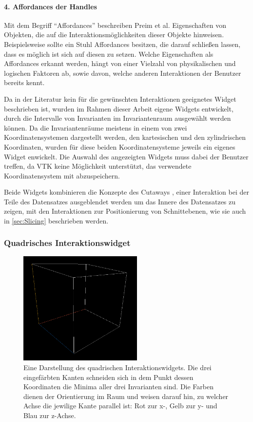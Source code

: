 \documentclass[a4paper,fontsize=12pt,toc=bib,halfparskip,ngerman]{scrartcl}
\begin{document}
\paragraph{4. Affordances der Handles}
Mit dem Begriff ``Affordances'' beschreiben Preim et al. \cite[S.~137]{preim2010interaktive} Eigenschaften von Objekten, die auf die Interaktionsm\"oglichkeiten dieser Objekte hinweisen. Beispielsweise sollte ein Stuhl Affordances besitzen, die darauf schlie{\ss}en lassen, dass es m\"oglich ist sich auf diesen zu setzen. Welche Eigenschaften als Affordances erkannt werden, h\"angt von einer Vielzahl von physikalischen und logischen Faktoren ab, sowie davon, welche anderen Interaktionen der Benutzer bereits kennt.

Da in der Literatur kein f\"ur die gew\"unschten Interaktionen geeignetes Widget beschrieben ist, wurden im Rahmen dieser Arbeit eigene Widgets entwickelt, durch die Intervalle von Invarianten im Invariantenraum ausgew\"ahlt werden k\"onnen. Da die Invariantenr\"aume meistens in einem von zwei Koordinatensystemen dargestellt werden, den kartesischen und den zylindrischen Koordinaten, wurden f\"ur diese beiden Koordinatensysteme jeweils ein eigenes Widget enwickelt. Die Auswahl des angezeigten Widgets muss dabei der Benutzer treffen, da VTK keine M\"oglichkeit unterst\"utzt, das verwendete Koordinatensystem mit abzuspeichern.

Beide Widgets kombinieren die Konzepte des Cutaways \cite[S.~406~f.]{preim2015interaktive}, einer Interaktion bei der Teile des Datensatzes ausgeblendet werden um das Innere des Datensatzes zu zeigen, mit den Interaktionen zur Positionierung von Schnittebenen, wie sie auch in \cref{sec:Slicing} beschrieben werden. 

\subsubsection{Quadrisches Interaktionswidget}

\begin{figure}
	\centering
	\includegraphics[width=0.55\textwidth]{pictures/QuadricInteractions.png}
	\caption{Eine Darstellung des quadrischen Interaktionswidgets. Die drei eingef\"arbten Kanten schneiden sich in dem Punkt dessen Koordinaten die Minima aller drei Invarianten sind. Die Farben dienen der Orientierung im Raum und weisen darauf hin, zu welcher Achse die jewilige Kante parallel ist: Rot zur x-, Gelb zur y- und Blau zur z-Achse.}
	\label{CubicalInteractions}
\end{figure}
\end{document}

